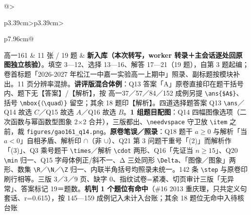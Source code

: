 \documentclass[a4paper,11pt]{article}
\begin{document}
\begin{xltabular}{\textwidth}{@{}>{\raggedright\arraybackslash}p{3.39cm}>{\centering\arraybackslash}p{3.39cm}>{\raggedright\arraybackslash}p{7.96cm}@{}}
高一161 & 11 张 / 19 题 & \textbf{新入库（本次转写，worker 转录＋主会话逐处回原图独立核验）}。填空 3---12、选择 13---16、解答 17---21（19 题），自第 3 题起编；卷首标题「2026-2027 年松江一中嘉一实验高一上期中」照录、副标题按模块补出。11 页分辨率混排。\textbf{讲评版混合体例}：Q13 答案「A」原卷直接印在题干括号内、题下无【答案】/【解析】，按 高一37／57／84／152 成例另提 \texttt{\textbackslash{}ans\{\$A\$\}}、括号 \texttt{\textbackslash{}mbox\{（\textbackslash{}quad）\}} 留空；其余 18 题印【解析】。四道选择题答案 Q13 \texttt{\textbackslash{}ans}／Q14 故选 \(C\)／Q15 故选 \(A\)／Q16 故选 \(B\)。\textbf{1 组题目配图}：Q14 四幅图像选项（二次函数与幂函数型图象 2$\times$2 合并），三版都出、\texttt{\textbackslash{}needvspace} 守卫放 \texttt{\textbackslash{}item} 之前，裁 \texttt{figures/\allowbreak{}gao161\_q14.png}。\textbf{原卷笔误／照录}：Q18 题干 \(a\geqslant\allowbreak 0\) 与解析「当 \(a<0\)」自相矛盾、解析印 $\cap$（非 $\cup$）、Q21 第 3 问题干重号「(2)」而解析作「(3)」、Q3 乘号题干 \texttt{\textbackslash{}times}／解析 \texttt{\textbackslash{}cdot} 两形、Q16「先证当 \(n\geqslant\allowbreak 15\)」、Q20 \texttt{\textbackslash{}min} 归一、Q15 字母体例正/斜不一、Δ 三处同形 \texttt{\textbackslash{}Delta}、「图像／图象」两形、数集 \texttt{\textbackslash{}R}／\texttt{\textbackslash{}N}／\texttt{\textbackslash{}Z} 归一、内联半角括号均照录未统一。142 条 \texttt{\textbackslash{}step} 与原卷印刷行相等。三版 3／3／9 页、缺字 0、指纹试卷=紧凑、切页审计三版「无异常」、答案标记 19＝题数。\textbf{机判 1 个题位有命中}（\#16 2013 重庆理，只共定义句套话、r=0.615），按 145---159 成例记入未计入台账；其余 18 题位无命中入待核台账 \\ \addlinespace[1pt]

\end{xltabular}
\end{document}
